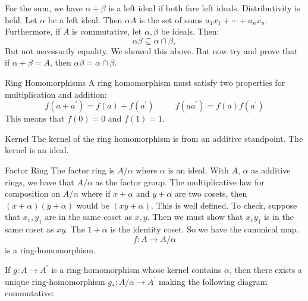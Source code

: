 \documentclass{report}
\begin{document}
For the sum, we have $\alpha + \beta$ is a left ideal if both fare left ideals. Distributivity is held. Let $\alpha$ be a left ideal. Then $\alpha A$ is the set of sums $a_{1}x_{1} + \cdots + a_{n}x_{n}$. Furthermore, if $A$ is commutative, let $\alpha, \beta$ be ideals. Then:
    \begin{equation*}
        \alpha\beta \subseteq \alpha \cap \beta,
    \end{equation*}
But not necessarily equality. We showed this above. But now try and prove that if $\alpha + \beta = A$, then $\alpha\beta = \alpha \cap \beta$.

\begin{definition}{Ring Homomorphisms}
    A ring homomorphism must satisfy two properties for multiplication and addition:
        \begin{equation*}
            f(a + a^{\prime}) = f(a) + f(a^{\prime}) \hspace{30pt} f(aa^{\prime}) = f(a)f(a^{\prime})
        \end{equation*}
    This means that $f(0) = 0$ and $f(1) = 1$.
\end{definition}

\begin{definition}{Kernel}
    The kernel of the ring homomorphism is from an additive standpoint. The kernel is an ideal.
\end{definition} 

\begin{definition}{Factor Ring}
    The factor ring is $A/\alpha$ where $\alpha $ is an ideal. With $A$, $\alpha$ as additive rings, we have that $A/\alpha$ as the factor group. The multiplicative law for composition on $A/\alpha$ where if $x + \alpha$ and $y + \alpha$ are two cosets, then $(x + \alpha)(y + \alpha)$ would be $(xy + \alpha)$. This is well defined. To check, suppose that $x_{1}, y_{1}$ are in the same coset as $x, y$. Then we must show that $x_{1}y_{1}$ is in the same coset as $xy$. The $1 + \alpha$ is the identity coset. So we have the canonical map.
        \begin{equation*}
            f : A \rightarrow A/\alpha
        \end{equation*}
    is a ring-homomorphism.
\end{definition}

If $g : A \rightarrow A^{\prime}$ is a ring-homomorphism whose kernel contains $\alpha$, then there exists a unique ring-homomorphism $g_{*} : A/\alpha \rightarrow A^{\prime}$ making the following diagram commutative:
    \begin{center}
    \end{center}
\end{document}
